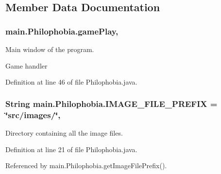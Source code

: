 \subsection{Member Data Documentation}
\hypertarget{classmain_1_1_philophobia_a1abf384f2796e5ab254ff71c36ef939d}{
\subsubsection[{game\-Play}]{ main.\-Philophobia.\-game\-Play\hspace{0.3cm}{\ttfamily [static]}, {\ttfamily [protected]}}}\label{classmain_1_1_philophobia_a1abf384f2796e5ab254ff71c36ef939d}


Main window of the program. 

Game handler 

Definition at line 46 of file Philophobia.\-java.

\hypertarget{classmain_1_1_philophobia_a1e42124b5f083b3b4f1e6eb5ba774552}{
\subsubsection[{I\-M\-A\-G\-E\-\_\-\-F\-I\-L\-E\-\_\-\-P\-R\-E\-F\-I\-X}]{\setlength{\rightskip}{0pt plus 5cm}String main.\-Philophobia.\-I\-M\-A\-G\-E\-\_\-\-F\-I\-L\-E\-\_\-\-P\-R\-E\-F\-I\-X = \char`\"{}src/images/\char`\"{}\hspace{0.3cm}{\ttfamily [static]}, {\ttfamily [protected]}}}\label{classmain_1_1_philophobia_a1e42124b5f083b3b4f1e6eb5ba774552}


Directory containing all the image files. 



Definition at line 21 of file Philophobia.\-java.



Referenced by main.\-Philophobia.\-get\-Image\-File\-Prefix().

